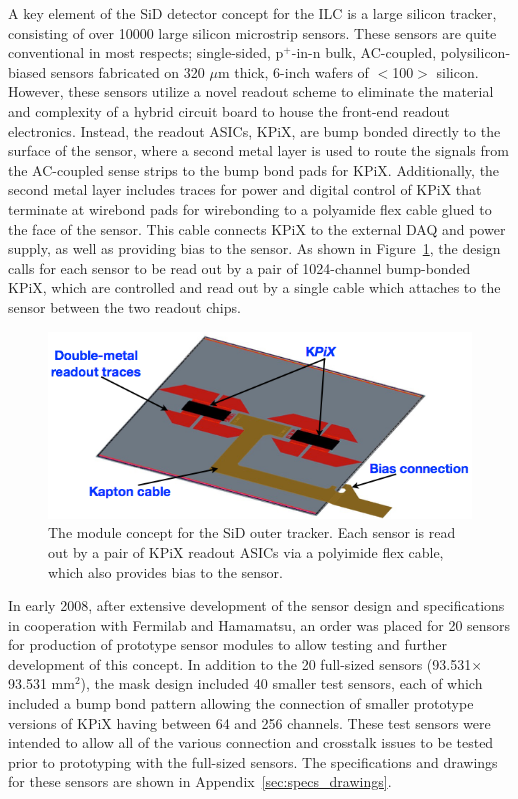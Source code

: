 \documentclass[prc,12pt,nofootinbib,letterpaper]{revtex4}
\begin{document}
A key element of the SiD detector concept for the ILC is a large silicon tracker, consisting of over 10000 large silicon microstrip sensors. These sensors are quite conventional in most respects; single-sided, p$^+$-in-n bulk, AC-coupled, polysilicon-biased sensors fabricated on 320 $\mu$m thick,  6-inch wafers of $<$100$>$ silicon.  However, these sensors utilize a novel readout scheme to eliminate the material and complexity of a hybrid circuit board to house the front-end readout electronics.  Instead, the readout ASICs, KPiX, are bump bonded directly to the surface of the sensor, where a second metal layer is used to route the signals from the AC-coupled sense strips to the bump bond pads for KPiX.  Additionally, the second metal layer includes traces for power and digital control of KPiX that terminate at wirebond pads for wirebonding to a polyamide flex cable glued to the face of the sensor. This cable connects KPiX to the external DAQ and power supply, as well as providing bias to the sensor.  As shown in Figure~\ref{fig:module}, the design calls for each sensor to be read out by a pair of 1024-channel bump-bonded KPiX, which are controlled and read out by a single cable which attaches to the sensor between the two readout chips.
\begin{figure}[htbp]
\begin{center}
    \includegraphics[width=\textwidth]{figures/module}
\caption{The module concept for the SiD outer tracker.  Each sensor is read out by a pair of KPiX readout ASICs via a polyimide flex cable, which also provides bias to the sensor.}
\label{fig:module}
\end{center}
\end{figure}
In early 2008, after extensive development of the sensor design and specifications in cooperation with Fermilab and Hamamatsu, an order was placed for 20 sensors for production of prototype sensor modules to allow testing and further development of this concept.  In addition to the 20 full-sized sensors (93.531$\times$93.531 mm$^2$), the mask design included 40 smaller test sensors, each of which included a bump bond pattern allowing the connection of smaller prototype versions of KPiX having between 64 and 256 channels.  These test sensors were intended to allow all of the various connection and crosstalk issues to be tested prior to prototyping with the full-sized sensors.  The specifications and drawings for these sensors are shown in Appendix~\ref{sec:specs_drawings}.
\end{document}

